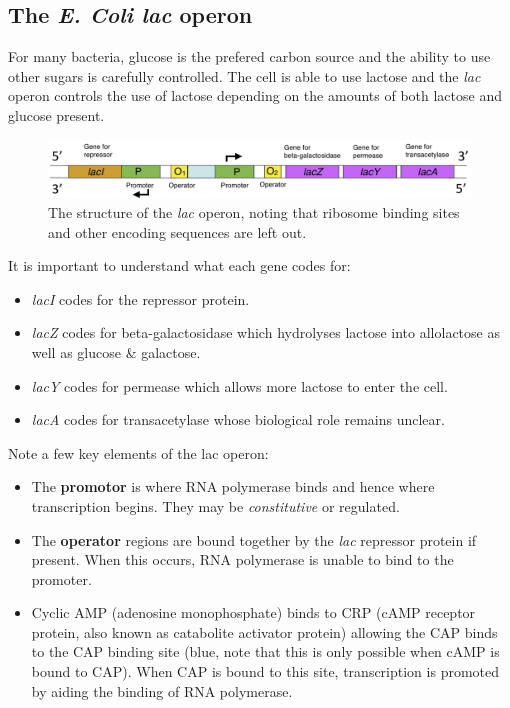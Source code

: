 \documentclass[a4paper]{article}
\newcommand{\introduce}[1]{%
  \leavevmode %
  \marginpar{\small\emph{#1}}%
}
\begin{document}
\subsection{The \emph{E. Coli lac} operon}
For many bacteria, glucose is the prefered carbon source and the ability to use other sugars is carefully controlled. The cell is able to use lactose and the \emph{lac} operon controls the use of lactose depending on the amounts of both lactose and glucose present.

\begin{figure}[h!]
\begin{centering}
\includegraphics[width=\textwidth]{lacOperon}
\caption{\label{fig:lacOperon} The structure of the \emph{lac} operon, noting that ribosome binding sites and other encoding sequences are left out.}
\end{centering}
\end{figure}

It is important to understand what each gene codes for:
\begin{itemize}
\item\emph{lacI}\introduce{lacI} codes for the repressor protein.
\item\emph{lacZ}\introduce{lacZ} codes for beta-galactosidase which hydrolyses lactose into allolactose as well as glucose \& galactose.
\item\emph{lacY}\introduce{lacY} codes for permease which allows more lactose to enter the cell.
\item\emph{lacA}\introduce{lacA} codes for transacetylase whose biological role remains unclear.
\end{itemize}

Note a few key elements of the lac operon:
\begin{itemize}
\item The \textbf{promotor} is where RNA polymerase binds and hence where transcription begins. They may be \emph{constitutive} or regulated. 
\item The \textbf{operator} regions are bound together by the \emph{lac} repressor protein if present. When this occurs, RNA polymerase is unable to bind to the promoter.
\item Cyclic AMP (adenosine monophosphate) binds to CRP (cAMP receptor protein, also known as catabolite activator protein) allowing the CAP binds to the CAP binding site (blue, note that this is only possible when cAMP is bound to CAP). When CAP is bound to this site, transcription is promoted by aiding the binding of RNA polymerase.
\end{itemize}
\end{document}
